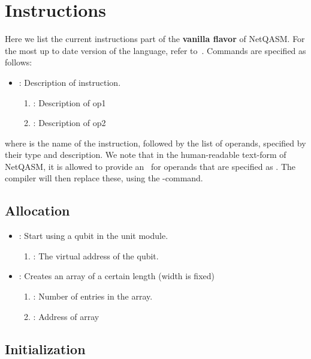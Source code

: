 \section{Instructions}
\label{app:instructions}
Here we list the current instructions part of the \textbf{vanilla flavor} of \ac{NetQASM}.
For the most up to date version of the language, refer to~\cite{git_netqasm}.
Commands are specified as follows:
\begin{itemize}
  \item {}: Description of instruction.
        \begin{enumerate}
          \item \IMMEDIATE : Description of op1
          \item \REGISTER : Description of op2
        \end{enumerate}
\end{itemize}

where  is the name of the instruction, followed by the list of operands, specified by their type and description.
We note that in the human-readable text-form of \ac{NetQASM}, it is allowed to provide an \IMMEDIATE\ for operands that are specified as \REGISTER.
The compiler will then replace these, using the -command.

\subsection{Allocation}

\begin{itemize}
  \item {}: Start using a qubit in the unit module.
        \begin{enumerate}
          \item \REGISTER: The virtual address of the qubit.
        \end{enumerate}
  \item {}: Creates an array of a certain length (width is fixed)
        \begin{enumerate}
          \item \IMMEDIATE: Number of entries in the array.
          \item \ADDRESS: Address of array
        \end{enumerate}
\end{itemize}


\subsection{Initialization}

